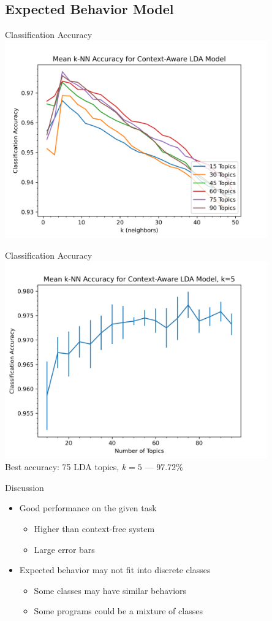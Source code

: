 \documentclass[handout,11pt]{beamer}
\begin{document}
	\subsection{Expected Behavior Model}
	\begin{frame}{Classification Accuracy}
		\centering
		\includegraphics[width=0.85\textwidth]{img/msoft_big/knn_lda_context.png}
	\end{frame}
	\begin{frame}{Classification Accuracy}
		\centering
		\includegraphics[width=0.85\textwidth]{img/msoft_big/knn_lda_context_k_05.png} \\
		Best accuracy: 75 LDA topics, $k=5$ --- 97.72\%
	\end{frame}
	\begin{frame}{Discussion}
		\begin{itemize}
			\item Good performance on the given task
				\begin{itemize}
					\item Higher than context-free system
					\item Large error bars
				\end{itemize}
			\item Expected behavior may not fit into discrete classes
				\begin{itemize}
					\item Some classes may have similar behaviors
					\item Some programs could be a mixture of classes
				\end{itemize}
		\end{itemize}
	\end{frame}
\end{document}
